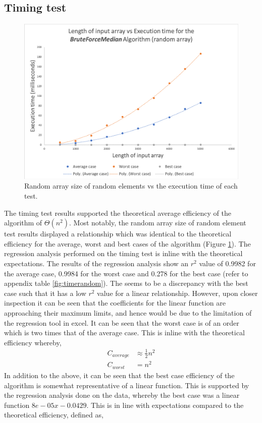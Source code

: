 \documentclass[12pt]{article}
\begin{document}
\subsection{Timing test}
\begin{figure}[H]
	\centering
	\includegraphics[width=0.75\linewidth]{Results/TimeRandom}
	\caption{Random array size of random elements vs the execution time of each test.}
	\label{fig:timerandomAnalysis}
\end{figure}

The timing test results supported the theoretical average efficiency of the algorithm of $\Theta (n^2)$. Most notably, the random array size of random element test results displayed a relationship which was identical to the theoretical efficiency for the average, worst and best cases of the algorithm (Figure \ref{fig:timerandomAnalysis}). The regression analysis performed on the timing test is inline with the theoretical expectations. The results of the regression analysis show an $r^2$ value of 0.9982 for the average case, 0.9984 for the worst case and 0.278 for the best case (refer to appendix table \ref{fig:timerandom}). The seems to be a discrepancy with the best case such that it has a low $r^2$ value for a linear relationship. However, upon closer inspection it can be seen that the coefficients for the linear function are approaching their maximum limits, and hence would be due to the limitation of the regression tool in excel. It can be seen that the worst case is of an order which is two times that of the average case. This is inline with the theoretical efficiency whereby,
\begin{align*}
C_{average} & \approx\frac{1}{2}n^2\\
C_{worst} &= n^2
\end{align*}
In addition to the above, it can be seen that the best case efficiency of the algorithm is somewhat representative of a linear function. This is supported by the regression analysis done on the data, whereby the best case was a linear function $8e-05x - 0.0429$. This is in line with expectations compared to the theoretical efficiency, defined as,
\end{document}
